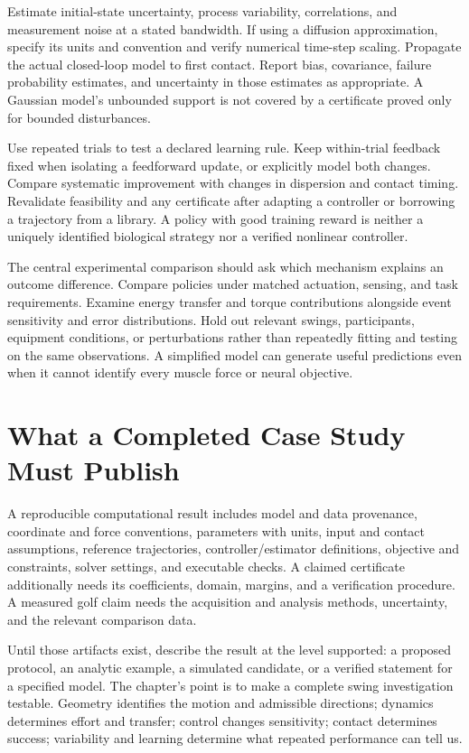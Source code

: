 \documentclass[12pt, openany]{book}
\theoremstyle{plain}
\begin{document}
Estimate initial-state uncertainty, process variability, correlations, and measurement noise at a stated bandwidth. If using a diffusion approximation, specify its units and convention and verify numerical time-step scaling. Propagate the actual closed-loop model to first contact. Report bias, covariance, failure probability estimates, and uncertainty in those estimates as appropriate. A Gaussian model's unbounded support is not covered by a certificate proved only for bounded disturbances.

Use repeated trials to test a declared learning rule. Keep within-trial feedback fixed when isolating a feedforward update, or explicitly model both changes. Compare systematic improvement with changes in dispersion and contact timing. Revalidate feasibility and any certificate after adapting a controller or borrowing a trajectory from a library. A policy with good training reward is neither a uniquely identified biological strategy nor a verified nonlinear controller.

The central experimental comparison should ask which mechanism explains an outcome difference. Compare policies under matched actuation, sensing, and task requirements. Examine energy transfer and torque contributions alongside event sensitivity and error distributions. Hold out relevant swings, participants, equipment conditions, or perturbations rather than repeatedly fitting and testing on the same observations. A simplified model can generate useful predictions even when it cannot identify every muscle force or neural objective.

\section{What a Completed Case Study Must Publish}

A reproducible computational result includes model and data provenance, coordinate and force conventions, parameters with units, input and contact assumptions, reference trajectories, controller/estimator definitions, objective and constraints, solver settings, and executable checks. A claimed certificate additionally needs its coefficients, domain, margins, and a verification procedure. A measured golf claim needs the acquisition and analysis methods, uncertainty, and the relevant comparison data.

Until those artifacts exist, describe the result at the level supported: a proposed protocol, an analytic example, a simulated candidate, or a verified statement for a specified model. The chapter's point is to make a complete swing investigation testable. Geometry identifies the motion and admissible directions; dynamics determines effort and transfer; control changes sensitivity; contact determines success; variability and learning determine what repeated performance can tell us.
\end{document}
